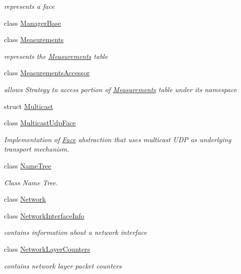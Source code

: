 \begin{DoxyCompactItemize}
\begin{DoxyCompactList}\small\item\em represents a face \end{DoxyCompactList}\item 
class \hyperlink{classnfd_1_1ManagerBase}{Manager\+Base}
\item 
class \hyperlink{classnfd_1_1Measurements}{Measurements}
\begin{DoxyCompactList}\small\item\em represents the \hyperlink{classnfd_1_1Measurements}{Measurements} table \end{DoxyCompactList}\item 
class \hyperlink{classnfd_1_1MeasurementsAccessor}{Measurements\+Accessor}
\begin{DoxyCompactList}\small\item\em allows Strategy to access portion of \hyperlink{classnfd_1_1Measurements}{Measurements} table under its namespace \end{DoxyCompactList}\item 
struct \hyperlink{structnfd_1_1Multicast}{Multicast}
\item 
class \hyperlink{classnfd_1_1MulticastUdpFace}{Multicast\+Udp\+Face}
\begin{DoxyCompactList}\small\item\em Implementation of \hyperlink{classnfd_1_1Face}{Face} abstraction that uses multicast U\+DP as underlying transport mechanism. \end{DoxyCompactList}\item 
class \hyperlink{classnfd_1_1NameTree}{Name\+Tree}
\begin{DoxyCompactList}\small\item\em Class Name Tree. \end{DoxyCompactList}\item 
class \hyperlink{classnfd_1_1Network}{Network}
\item 
class \hyperlink{classnfd_1_1NetworkInterfaceInfo}{Network\+Interface\+Info}
\begin{DoxyCompactList}\small\item\em contains information about a network interface \end{DoxyCompactList}\item 
class \hyperlink{classnfd_1_1NetworkLayerCounters}{Network\+Layer\+Counters}
\begin{DoxyCompactList}\small\item\em contains network layer packet counters \end{DoxyCompactList}\item 

\end{DoxyCompactItemize}
